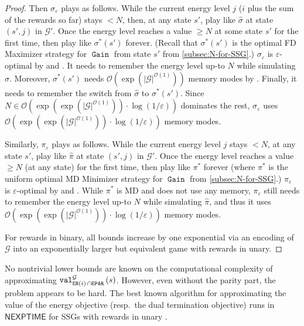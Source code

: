 \documentclass[a4paper,UKenglish,cleveref,autoref,thm-restate]{lipics-v2021}
\DeclareMathOperator{\Gain}{\mathtt{Gain}}
\newcommand{\Eparity}{\mathtt{EPAR}}
\newcommand{\en}{\mathtt{EN}}
\newcommand{\+}[1]{\mathbb{#1}}
\newcommand{\?}[1]{\mathcal{#1}}
\newcommand{\Ocompl}{\?{O}}
\newcommand{\abs}[1]{\lvert#1\rvert}
\newcommand{\size}[1]{\abs{#1}}
\newcommand{\eps}{\varepsilon}
\newcommand{\NEXPTIME}{\ensuremath{\mathsf{NEXPTIME}}}
\newcommand{\lrc}[1]{\left(#1\right)}
\newcommand{\game}{{\mathcal G}}
\newcommand{\s}{s}
\newcommand{\zstrat}{\sigma}
\newcommand{\ostrat}{\pi}
\newcommand{\optzstrat}{\zstrat^*}
\newcommand{\optostrat}{\ostrat^*}
\begin{document}
\begin{proof}
Then $\zstrat_\eps$ plays as follows.
While the current energy level $j$ ($i$ plus the sum of the rewards so far)
stays $<N$, then, at any state $\s'$, play like $\hat{\zstrat}$ at state
$(\s',j)$ in $\game'$.
Once the energy level reaches a value $\ge N$ at some state $\s'$
for the first time, then play like $\optzstrat(s')$ forever.
(Recall that $\optzstrat(s')$ is the optimal FD Maximizer strategy for $\Gain$
from state $s'$ from \cref{subsec:N-for-SSG}.)
$\zstrat_\eps$ is $\eps$-optimal by 
and .
It needs to remember the energy level up-to $N$ while simulating
$\hat{\zstrat}$. Moreover, $\optzstrat(s')$ needs
$\Ocompl(\exp(|\game|^{\Ocompl(1)}))$ memory modes by .
Finally, it needs to remember the switch from $\hat{\zstrat}$ to $\optzstrat(s')$.
Since $N \in
{\Ocompl}\left(\exp(\exp(\size{\game}^{\Ocompl(1)}))\cdot \log\lrc{1/\eps}\right)$
dominates the rest, $\zstrat_\eps$ uses
${\Ocompl}\left(\exp(\exp(\size{\game}^{\Ocompl(1)}))\cdot \log\lrc{1/\eps}\right)$ memory modes.

Similarly, $\ostrat_\eps$ plays as follows.
While the current energy level $j$ %
stays $<N$, at any state $\s'$, play like $\hat{\ostrat}$ at state
$(\s',j)$ in $\game'$.
Once the energy level reaches a value $\ge N$ (at any state)
for the first time, then play like $\optostrat$ forever
(where $\optostrat$ is the uniform optimal MD Minimizer strategy for 
$\Gain$ from \cref{subsec:N-for-SSG}.)
$\ostrat_\eps$ is $\eps$-optimal by 
and .
While $\optostrat$ is MD and does not use any memory, $\ostrat_\eps$ still
needs to remember the energy level up-to $N$
while simulating $\hat{\ostrat}$,
and thus it uses
${\Ocompl}\left(\exp(\exp(\size{\game}^{\Ocompl(1)}))\cdot \log\lrc{1/\eps}\right)$ memory modes.

For rewards in binary, all bounds increase by one exponential via an encoding
of $\game$ into an exponentially larger but equivalent game with rewards in unary.
\end{proof}

No nontrivial lower bounds are known on the computational complexity of
approximating $\valueof[\game][\en(i)\,\cap \Eparity]{\s}$.
However, even without the parity part, the problem appears to be hard.
The best known algorithm for approximating the value of the energy objective
(resp.\ the dual termination objective) runs in $\NEXPTIME$ for SSGs with
rewards in unary \cite{BBEK:IC2013}.
\end{document}
